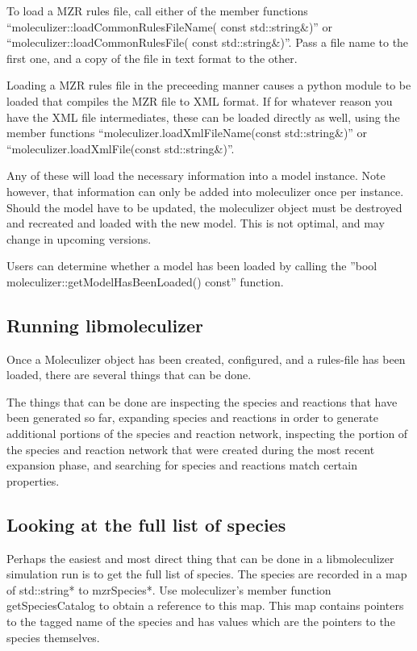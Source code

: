 To load a MZR rules file, call either of the member functions
``moleculizer::loadCommonRulesFileName( const std::string&)'' or
``moleculizer::loadCommonRulesFile( const std::string&)''.  Pass a
file name to the first one, and a copy of the file in text format to
the other.

Loading a MZR rules file in the preceeding manner causes a python
module to be loaded that compiles the MZR file to XML format.  If for
whatever reason you have the XML file intermediates, these can be
loaded directly as well, using the member functions
``moleculizer.loadXmlFileName(const std::string&)'' or
``moleculizer.loadXmlFile(const std::string&)''.  

Any of these will load the necessary information into a model
instance. Note however, that information can only be added into
moleculizer once per instance.  Should the model have to be updated,
the moleculizer object must be destroyed and recreated and loaded with
the new model.  This is not optimal, and may change in upcoming
versions.  

Users can determine whether a model has been loaded by calling
the ''bool moleculizer::getModelHasBeenLoaded() const'' function.  

 \subsection{Running libmoleculizer}
Once a Moleculizer object has been created, configured, and a
rules-file has been loaded, there are several things that can be done.

The things that can be done are inspecting the species and reactions
that have been generated so far, expanding species and reactions in
order to generate additional portions of the species and reaction
network, inspecting the portion of the species and reaction network
that were created during the most recent expansion phase, and
searching for species and reactions match certain properties.  

\subsection{Looking at the full list of species}
Perhaps the easiest and most direct thing that can be done in a
libmoleculizer simulation run is to get the full list of species.  The
species are recorded in a map of std::string* to mzrSpecies*.  Use
moleculizer's member function getSpeciesCatalog to obtain a reference
to this map.  This map contains pointers to the tagged name of the
species and has values which are the pointers to the species
themselves.  

